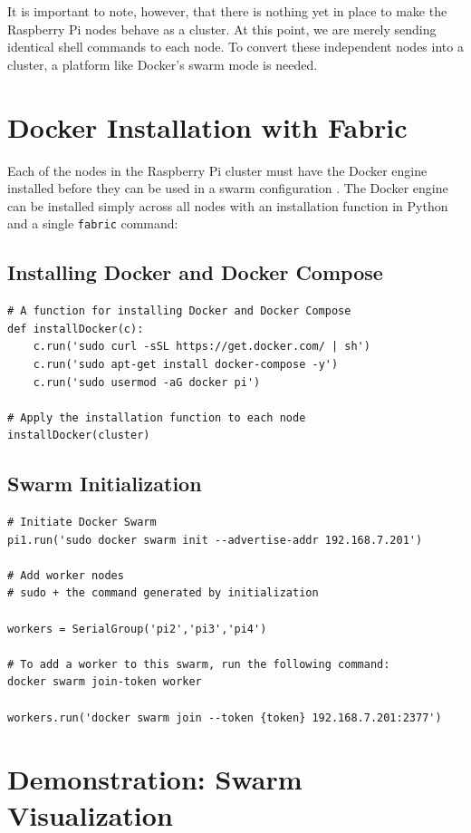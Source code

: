 \documentclass[sigconf]{acmart}
\begin{document}
It is important to note, however, that there is nothing yet in place to make the Raspberry Pi nodes behave as a cluster. At this point, we are merely sending identical shell commands to each node. To convert these independent nodes into a cluster, a platform like Docker's swarm mode is needed.

\section{Docker Installation with Fabric}

Each of the nodes in the Raspberry Pi cluster must have the Docker engine installed before they can be used in a swarm configuration \cite{swarmManual2018}. The Docker engine can be installed simply across all nodes with an installation function in Python and a single {\tt fabric} command:

\subsection{Installing Docker and Docker Compose}

\begin{lstlisting}
# A function for installing Docker and Docker Compose
def installDocker(c):
    c.run('sudo curl -sSL https://get.docker.com/ | sh')
    c.run('sudo apt-get install docker-compose -y')
    c.run('sudo usermod -aG docker pi')

# Apply the installation function to each node
installDocker(cluster)
\end{lstlisting}

\subsection{Swarm Initialization}

\begin{lstlisting}
# Initiate Docker Swarm
pi1.run('sudo docker swarm init --advertise-addr 192.168.7.201')

# Add worker nodes
# sudo + the command generated by initialization

workers = SerialGroup('pi2','pi3','pi4')

# To add a worker to this swarm, run the following command:
docker swarm join-token worker

workers.run('docker swarm join --token {token} 192.168.7.201:2377')
\end{lstlisting}

\section{Demonstration: Swarm Visualization}
\end{document}
